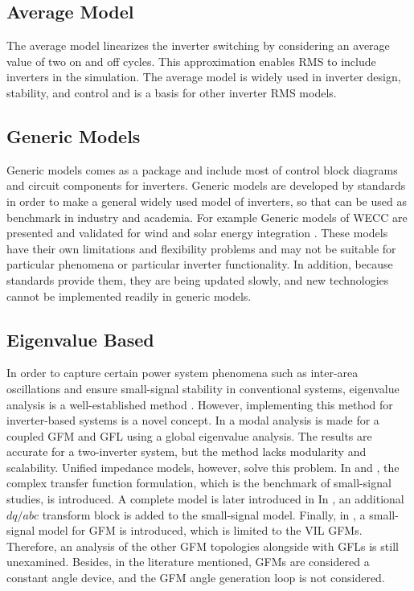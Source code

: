 \subsection{Average Model}

The average model linearizes the inverter switching by considering an average value of two on and off cycles. \cite{AVG} This approximation enables \gls{RMS} to include inverters in the simulation. The average model is widely used in inverter design, stability, and control and is a basis for other inverter \gls{RMS} models.  

\subsection{Generic Models}

Generic models comes as a package and include most of control block diagrams and circuit components for inverters. Generic models are developed by standards in order to make a general widely used model of inverters, so that can be used as benchmark in industry and academia. For example Generic models of \gls{WECC} are presented and validated for wind and solar energy integration \cite{GenericWECC}. These models have their own limitations and flexibility problems and may not be suitable for particular phenomena or particular inverter functionality. In addition, because standards provide them, they are being updated slowly, and new technologies cannot be implemented readily in generic models.

\subsection{Eigenvalue Based}

In order to capture certain power system phenomena such as inter-area oscillations and ensure small-signal stability in conventional systems, eigenvalue analysis is a well-established method \cite{kundur}. However, implementing this method for inverter-based systems is a novel concept. In \cite{invertermodal} a modal analysis is made for a coupled \gls{GFM} and \gls{GFL} using a global eigenvalue analysis. The results are accurate for a two-inverter system, but the method lacks modularity and scalability. Unified impedance models, however, solve this problem. In \cite{hr} and \cite{Uni}, the complex transfer function formulation, which is the benchmark of small-signal studies, is introduced. A complete model is later introduced in \cite{Uni} In \cite{Bwen}, an additional $dq/abc$ transform block is added to the small-signal model. Finally, in \cite{scholes2011lessons}, a small-signal model for \gls{GFM} is introduced, which is limited to the \gls{VIL} GFMs. Therefore, an analysis of the other GFM topologies alongside with GFLs is still unexamined. Besides, in the literature mentioned, GFMs are considered a constant angle device, and the GFM angle generation loop is not considered. 

